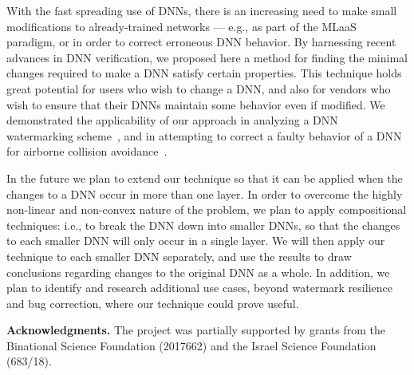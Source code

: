 \documentclass{easychair}
\newcommand{\guy}[1]{\marginpar{\textcolor{orange}{Guy: #1}}}
\begin{document}
With the fast spreading use of DNNs, there is an increasing need to
make small modifications to already-trained networks --- e.g., as part
of the MLaaS paradigm, or in order to correct erroneous DNN behavior. By
harnessing recent advances in DNN verification, we proposed here a
method for finding the minimal changes required to make a DNN satisfy
certain properties. This technique holds great potential
for users who wish to change a DNN, and also for vendors who
wish to ensure that their DNNs maintain some behavior even if
modified. We demonstrated the applicability of our approach in
analyzing a DNN watermarking scheme~\cite{AdBaPiKeWatermarking}, and
in attempting to correct a faulty behavior of a DNN for airborne
collision avoidance~\cite{JuLoBrOwKo16}.

In the future we plan to extend our technique so that it can be
applied when the changes to a DNN occur in more than one layer. In
order to overcome the highly non-linear and non-convex nature of the
problem, we plan to apply compositional techniques: i.e., to break the DNN
down into smaller DNNs, so that the changes to each smaller DNN will only occur in
a single layer. We will then apply our technique to each smaller DNN
separately, and use the results to draw conclusions regarding changes
to the original DNN as a whole. In addition, we plan to identify and  research additional
use cases, beyond watermark resilience and bug correction, where our technique
could prove useful.


\noindent
\textbf{Acknowledgments.}
The project was partially supported by grants from the Binational Science
Foundation (2017662) and the Israel Science Foundation (683/18).




\end{document}
